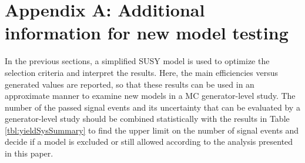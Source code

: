 \section{Appendix A: Additional information for new model testing} 
\label{sect:model}
In the previous sections, a simplified SUSY model is used to optimize the selection criteria and interpret the results. 
Here, the main efficiencies versus generated values are reported, so that these results can be used in 
an approximate manner to examine new models in a MC generator-level study. 
The number of the passed signal events and its uncertainty that 
can be evaluated by a generator-level study 
should be combined statistically with the results in Table \ref{tbl:yieldSysSummary} to find the upper limit 
on the number of signal events
and decide if a model is excluded or still allowed according to  the analysis presented in this paper.

